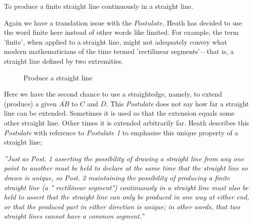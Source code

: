 \begin{post}
To produce a finite straight line continuously in a straight line.
\end{post}

Again we have a translation issue with the $\textit{Postulate}$, Heath has decided to use the word finite here instead of other words like limited. For example, the term 'finite', when applied to a straight line, might not adequately convey what modern mathematicians of the time termed 'rectilinear segments'—that is, a straight line defined by two extremities.

\vspace{0.5cm}

\begin{figure}[H]
\centering
		\caption{Produce a straight line}
\end{figure}


Here we have the second chance to use a straightedge, namely, to extend (produce) a given $\overline{AB}$ to $C$ and $D$. This \textit{Postulate} does not say how far a straight line can be extended. Sometimes it is used so that the extension equals some other straight line. Other times it is extended arbitrarily far. Heath describes this \textit{Postulate} with reference to \textit{Postulate 1} to emphasise this unique property of a straight line;

\textit{''Just as Post. 1 asserting the possibility of drawing a straight line from any one point to another must be held to declare at the same time that the straight line so drawn is unique, so Post. 2 maintaining the possibility of producing a finite straight line (a " rectilinear segment") continuously in a straight line must also be held to assert that the straight line can only be produced in one way at either end, or that the produced part in either direction is unique; in other words, that two straight lines cannot have a common segment.''}

